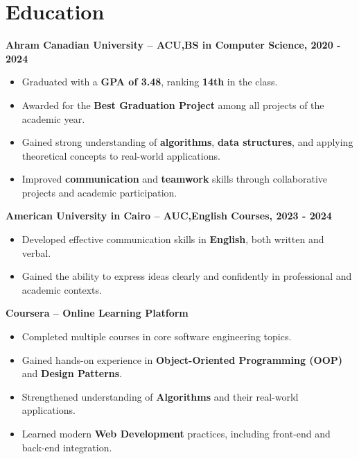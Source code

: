 \documentclass[a4paper,12pt]{article}
\begin{document}
\vspace{-1.9em}
\section*{Education}
\vspace{-1em}

\noindent\textbf{Ahram Canadian University – ACU,BS in Computer Science, 2020 - 2024 }\\[-1.2em]
\begin{itemize}[nosep]
    \item Graduated with a \textbf{GPA of 3.48}, ranking \textbf{14th} in the class.
    \item Awarded for the \textbf{Best Graduation Project} among all projects of the academic year.
    \item Gained strong understanding of \textbf{algorithms}, \textbf{data structures}, and applying theoretical concepts to real-world applications.
    \item Improved \textbf{communication} and \textbf{teamwork} skills through collaborative projects and academic participation.
\end{itemize}

\noindent\textbf{American University in Cairo – AUC,English Courses, 2023 - 2024 }\\[-1.2em]
\begin{itemize}[nosep]
    \item Developed effective communication skills in \textbf{English}, both written and verbal.
    \item Gained the ability to express ideas clearly and confidently in professional and academic contexts.
\end{itemize}

\noindent\textbf{Coursera – Online Learning Platform}\\[-1.2em]
\begin{itemize}[nosep]
    \item Completed multiple courses in core software engineering topics.
    \item Gained hands-on experience in \textbf{Object-Oriented Programming (OOP)} and \textbf{Design Patterns}.
    \item Strengthened understanding of \textbf{Algorithms} and their real-world applications.
    \item Learned modern \textbf{Web Development} practices, including front-end and back-end integration.
\end{itemize}
\end{document}
